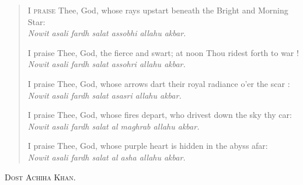 \begin{verse}
I \textsc{praise} Thee, God, whose rays upstart beneath the Bright and Morning Star: \\
\textit{Nowit asali fardh salat assobhi allahu akbar.}

I praise Thee, God, the fierce and swart; at noon Thou ridest forth to war ! \\
\textit{Nowit asali fardh salat assohri allahu akbar.}

I praise Thee, God, whose arrows dart their royal radiance o'er the scar : \\
\textit{Nowit asali fardh salat asasri allahu akbar.}

I praise Thee, God, whose fires depart, who drivest down the sky thy car: \\
\textit{Nowit asali fardh salat al maghrab allahu akbar.}

I praise Thee, God, whose purple heart is hidden in the abyss afar: \\
\textit{Nowit asali fardh salat al asha allahu akbar.}
\end{verse}

{\raggedleft
  \textsc{Dost Achiha Khan.}
\par}
